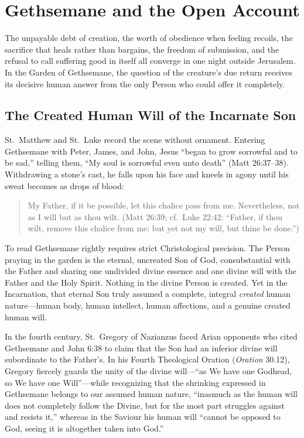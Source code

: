 \section{Gethsemane and the Open Account}

The unpayable debt of creation, the worth of obedience when feeling recoils, the sacrifice that heals rather than bargains, the freedom of submission, and the refusal to call suffering good in itself all converge in one night outside Jerusalem. In the Garden of Gethsemane, the question of the creature's due return receives its decisive human answer from the only Person who could offer it completely.

\subsection{The Created Human Will of the Incarnate Son}

St.\ Matthew and St.\ Luke record the scene without ornament. Entering Gethsemane with Peter, James, and John, Jesus ``began to grow sorrowful and to be sad,'' telling them, ``My soul is sorrowful even unto death'' (Matt 26:37--38). Withdrawing a stone's cast, he falls upon his face and kneels in agony until his sweat becomes as drops of blood:

\begin{quote}
My Father, if it be possible, let this chalice pass from me. Nevertheless, not as I will but as thou wilt. (Matt 26:39; cf.\ Luke 22:42: ``Father, if thou wilt, remove this chalice from me: but yet not my will, but thine be done.'')
\end{quote}

To read Gethsemane rightly requires strict Christological precision. The Person praying in the garden is the eternal, uncreated Son of God, consubstantial with the Father and sharing one undivided divine essence and one divine will with the Father and the Holy Spirit. Nothing in the divine Person is created. Yet in the Incarnation, that eternal Son truly assumed a complete, integral \emph{created} human nature---human body, human intellect, human affections, and a genuine created human will.

In the fourth century, St.\ Gregory of Nazianzus faced Arian opponents who cited Gethsemane and John 6:38 to claim that the Son had an inferior divine will subordinate to the Father's. In his Fourth Theological Oration (\emph{Oration} 30.12), Gregory fiercely guards the unity of the divine will---``as We have one Godhead, so We have one Will''---while recognizing that the shrinking expressed in Gethsemane belongs to our assumed human nature, ``inasmuch as the human will does not completely follow the Divine, but for the most part struggles against and resists it,'' whereas in the Saviour his human will ``cannot be opposed to God, seeing it is altogether taken into God.''

